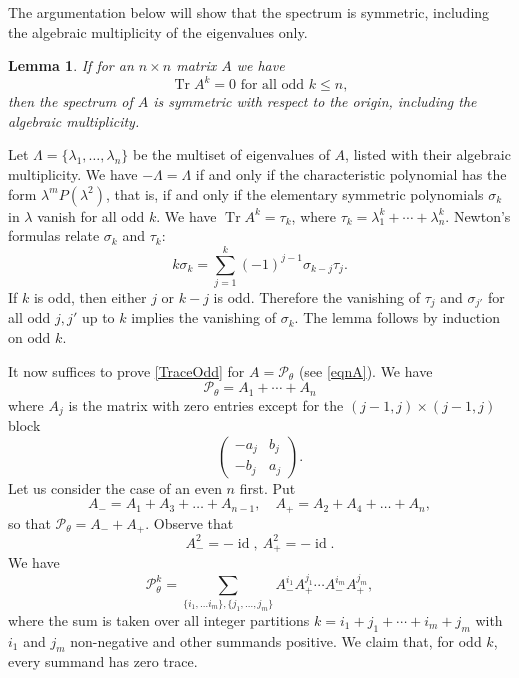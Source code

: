 \documentclass[12pt]{article}
\makeatletter
\newtheorem{lemma}{Lemma}[section]
\renewenvironment{proof}[1][\proofname] 
{\par\pushQED{\qed}\normalfont\topsep6\p@\@plus6\p@\relax\trivlist\item[\hskip\labelsep\bfseries#1\@addpunct{.}]\ignorespaces}{\popQED\endtrivlist\@endpefalse}
\newcommand{\Pev}{\mathcal{P}}
\newcommand{\tr}{\operatorname{Tr}}
\newcommand{\Ao}{A_-}
\newcommand{\Ae}{A_+}
\newcommand{\id}{\operatorname{id}}
\makeatother
\begin{document}
\begin{proof}[First Proof (partial)] The argumentation below will show that the spectrum is symmetric, including the algebraic multiplicity of the eigenvalues only.
	
\begin{lemma}
If for an $n \times n$ matrix $A$ we have
\begin{equation}
\label{TraceOdd}
\tr A^k = 0 \text{ for all odd }k \le n,
\end{equation}
then the spectrum of $A$ is symmetric with respect to the origin, including the algebraic multiplicity.
\end{lemma}
\begin{proof}
Let $\Lambda = \{\lambda_1, \ldots, \lambda_n\}$ be the multiset of eigenvalues of $A$, listed with their algebraic multiplicity. We have $-\Lambda = \Lambda$ if and only if the characteristic polynomial has the form $\lambda^m P(\lambda^2)$, that is, if and only if the elementary symmetric polynomials $\sigma_k$ in $\lambda$ vanish for all odd $k$. We have $\tr A^k = \tau_k$, where
$\tau_k = \lambda_1^k + \cdots + \lambda_n^k$.
Newton's formulas relate $\sigma_k$ and $\tau_k$:
\[ k\sigma_k = \sum_{j=1}^k (-1)^{j-1} \sigma_{k-j} \tau_j. \]
If $k$ is odd, then either $j$ or $k-j$ is odd. Therefore the vanishing of $\tau_j$ and $\sigma_{j'}$ for all odd $j, j'$ up to $k$ implies the vanishing of $\sigma_k$. The lemma follows by induction on odd $k$. 
\end{proof}
	
It now suffices to prove \eqref{TraceOdd} for $A=\Pev_\theta$ (see \eqref{eqnA}). We have
\[ \Pev_\theta = A_1 + \cdots + A_n \]
where $A_j$ is the matrix with zero entries except for the $(j-1,j)\times(j-1,j)$ block
\[
\begin{pmatrix}
-a_j & b_j\\ -b_j & a_j
\end{pmatrix}.
\]
Let us consider the case of an even $n$ first. Put
\[ \Ao = A_1 + A_3 + \ldots + A_{n-1}, \quad \Ae = A_2 + A_4 + \ldots + A_n, \]
so that $\Pev_\theta = \Ao + \Ae$. Observe that
\begin{equation}
\label{SquareId}
\Ao^2 = -\id,\ \Ae^2=-\id.
\end{equation}
We have
\begin{equation}
\label{eqnAk}
\Pev_\theta^k = \sum\limits_{\{i_1,\dots i_m\},{ \{j_1,\dots, j_m\}}} \Ao^{i_1} \Ae^{j_1} \cdots \Ao^{i_m} \Ae^{j_m},
\end{equation}
where the sum is taken over all integer partitions $k = i_1 + j_1 + \cdots + i_m + j_m$ with $i_1$ and $j_m$ non-negative and other summands positive. We claim that, for odd $k$, every summand has zero trace.
	

\end{proof}
\end{document}
